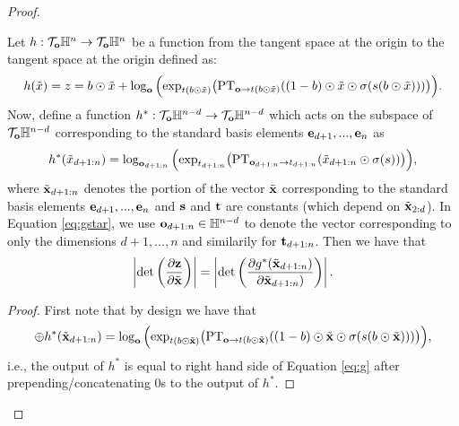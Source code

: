 \begin{proof}
\begin{lemma}
Let $h : \mathcal{T}_{\mathbf{o}}\mathbb{H}^n \rightarrow \mathcal{T}_{\mathbf{o}}\mathbb{H}^n$ be a function from the tangent space at the origin to the tangent space at the origin defined as:
\begin{equation}\label{eq:g}
h(\tilde{x}) = z = b \odot \tilde{
    x} + \log_{\textbf{o}}\Big( \textnormal{exp}_{t(b \odot \tilde{x})}\big(\textnormal{PT}_{\textbf{o}\to t(b \odot \tilde{x}) }((1-b) \odot \tilde{x} \odot \sigma(s(b \odot \tilde{x})))\big)\Big).
\end{equation}
Now, define a function $h^* : \mathcal{T}_{\mathbf{o}}\mathbb{H}^{n-d} \rightarrow \mathcal{T}_{\mathbf{o}}\mathbb{H}^{n-d}$ which acts on the subspace of $\mathcal{T}_{\mathbf{o}}\mathbb{H}^{n-d}$ corresponding to the standard basis elements $\mathbf{e}_{d+1}, ..., \mathbf{e}_n$ as
\begin{equation}\label{eq:gstar}
h^*(\tilde{x}_{d+1:n}) =   \log_{\mathbf{o}_{d+1:n}}\Big( \textnormal{exp}_{t_{d+1:n}}\big(\textnormal{PT}_{\mathbf{o}_{d+1:n} \to t_{d+1:n}}( \tilde{x}_{d+1:n} \odot \sigma(s))\big)\Big),
\end{equation}
where $\tilde{\mathbf{x}}_{d+1:n}$ denotes the portion of the vector $\tilde{\mathbf{x}}$ corresponding to the standard basis elements $\mathbf{e}_{d+1}, ..., \mathbf{e}_n$ and $\mathbf{s}$ and $\mathbf{t}$ are constants (which depend on $\tilde{\mathbf{x}}_{2:d}$).
In Equation \eqref{eq:gstar}, we use $\mathbf{o}_{d+1:n} \in \mathbb{H}^{n-d}$ to denote the vector corresponding to only the dimensions $d+1, ..., n$ and similarily for $\mathbf{t}_{d+1:n}$.
Then we have that
\begin{equation}
    \left|\textnormal{det}\left(\frac{\partial \mathbf{z}}{\partial \tilde{\mathbf{x}}}\right)\right| =    \left|\textnormal{det}\left(\frac{\partial g^*(\tilde{\mathbf{x}}_{d+1:n})}{\partial \tilde{\mathbf{x}}_{d+1:n})}\right)\right|.
\end{equation}
\end{lemma}
\begin{proof}
First note that by design we have that 
\begin{equation}
    [0,0..,0] \oplus h^*(\tildex_{d+1:n}) = \log_{\textbf{o}}\Big( \textnormal{exp}_{t(b \odot \tilde{\mb{x}})}\big(\textnormal{PT}_{\textbf{o}\to t(b \odot \tilde{\mb{x}}) }((1-b) \odot \tilde{\mb{x}} \odot \sigma(s(b \odot \tildex)))\big)\Big),
\end{equation}
i.e., the output of $h^*$ is equal to right hand side of Equation \eqref{eq:g} after prepending/concatenating 0s to the output of $h^*$. 


\end{proof}
\end{proof}
